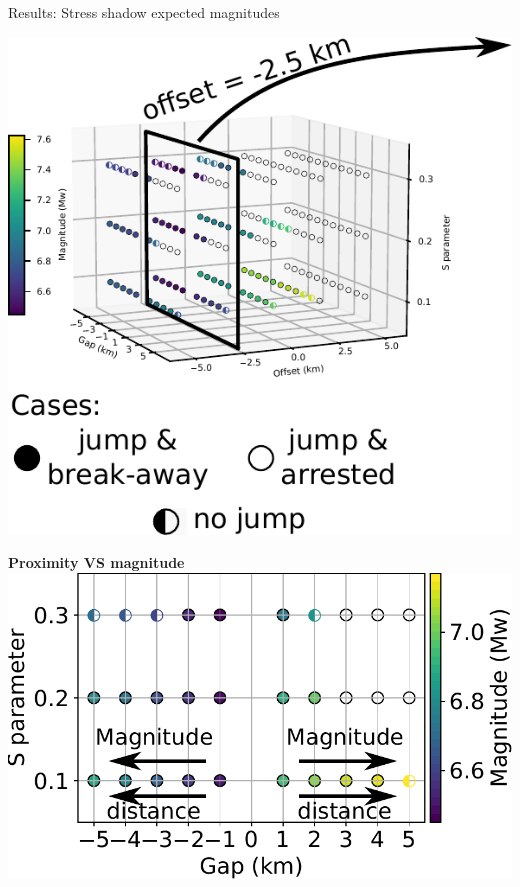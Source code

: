 \documentclass{beamer}
\begin{document}
\begin{frame}
 {Results: Stress shadow  expected magnitudes}
 
 \begin{minipage}{0.45\linewidth}
  \includegraphics[width=1\linewidth]{images/tests_shmax340_1plane2}
 \end{minipage} \pause
 \begin{minipage}{0.53\linewidth}
  \vskip -0.1cm
  \begin{center}
  \textbf{Proximity VS magnitude}
  \vskip 0.4cm
  \includegraphics[width=0.9\linewidth]{images/tests_stress} \pause   
  \end{center}
  \vskip -0.4cm
  \begin{itemize}

\end{itemize}
\end{minipage}
\end{frame}
\end{document}
